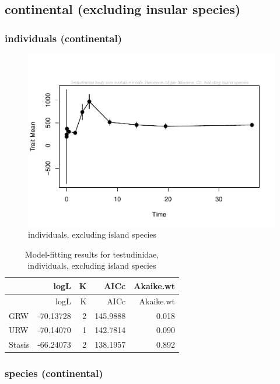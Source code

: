 \documentclass[]{article}
\begin{document}
\newpage

\subsection{continental (excluding insular
species)}\label{continental-excluding-insular-species}

\subsubsection{individuals (continental)}\label{individuals-continental}

\begin{figure}[htbp]
\centering
\includegraphics{MA_JJ_files/figure-latex/paleoTS, individuals, exluding island species-1.pdf}
\caption{individuals, excluding island species}
\end{figure}

\begin{longtable}[]{@{}lrrrr@{}}
\caption{Model-fitting results for testudinidae, individuals, excluding
island species}\tabularnewline
\toprule
& logL & K & AICc & Akaike.wt\tabularnewline
\midrule
\endfirsthead
\toprule
& logL & K & AICc & Akaike.wt\tabularnewline
\midrule
\endhead
GRW & -70.13728 & 2 & 145.9888 & 0.018\tabularnewline
URW & -70.14070 & 1 & 142.7814 & 0.090\tabularnewline
Stasis & -66.24073 & 2 & 138.1957 & 0.892\tabularnewline
\bottomrule
\end{longtable}

\newpage

\subsubsection{species (continental)}\label{species-continental}
\end{document}
